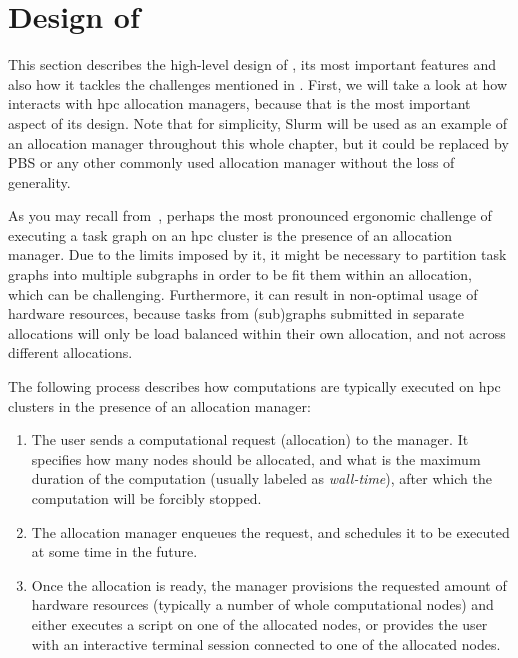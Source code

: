 
\section{Design of \hyperqueue{}}
\label{sec:hq-design}
This section describes the high-level design of \hyperqueue{}, its most important features
and also how it tackles the challenges mentioned in . First, we will take a
look at how \hyperqueue{} interacts with \gls{hpc} allocation managers,
because that is the most important aspect of its design. Note that for simplicity, Slurm will be
used as an example of an allocation manager throughout this whole chapter, but it could be replaced
by PBS or any other commonly used allocation manager without the loss of generality.

As you may recall from~, perhaps the most pronounced ergonomic challenge of
executing a task graph on an \gls{hpc} cluster is the presence of an allocation
manager. Due to the limits imposed by it, it might be necessary to partition task graphs into
multiple subgraphs in order to be fit them within an allocation, which can be challenging.
Furthermore, it can result in non-optimal usage of hardware resources, because tasks from
(sub)graphs submitted in separate allocations will only be load balanced within their own
allocation, and not across different allocations.

The following process describes how computations are typically executed on \gls{hpc}
clusters in the presence of an allocation manager:

\begin{enumerate}
	\item The user sends a computational request (allocation) to the manager. It specifies how many nodes
	      should be allocated, and what is the maximum duration of the computation (usually labeled as
	      \emph{wall-time}), after which the computation will be forcibly stopped.
	\item The allocation manager enqueues the request, and schedules it to be executed at some time in the
	      future.
	\item Once the allocation is ready, the manager provisions the requested amount of hardware resources
	      (typically a number of whole computational nodes) and either executes a script on one of the
	      allocated nodes, or provides the user with an interactive terminal session connected to one of the
	      allocated nodes.
\end{enumerate}


